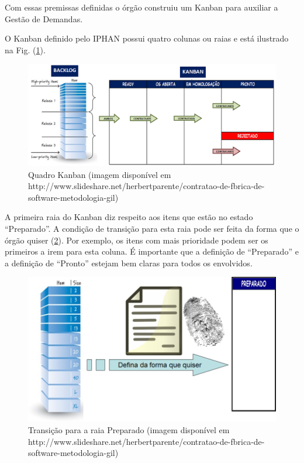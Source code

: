 Com essas premissas definidas o órgão construiu um Kanban para auxiliar a Gestão de Demandas. 

O Kanban definido pelo IPHAN possui quatro colunas ou raias e está ilustrado na Fig. (\ref{kanban1}).

\begin{figure}[H]
		\centering
		
			\includegraphics[scale=0.5]{figuras/kanbanIPHAN1.png}
		\caption{Quadro Kanban (imagem disponível em http://www.slideshare.net/herbertparente/contratao-de-fbrica-de-software-metodologia-gil) }
	\label{kanban1}
\end{figure}

A primeira raia do Kanban diz respeito aos itens que estão no estado “Preparado”. A condição de transição para esta raia pode ser feita da forma que o órgão quiser (\ref{kanban2}). Por exemplo, os itens com mais prioridade podem ser os primeiros a irem para esta coluna. É importante que a definição de “Preparado” e a definição de “Pronto” estejam bem claras para todos os envolvidos.

\begin{figure}[H]
		\centering
		
			\includegraphics[scale=0.5]{figuras/kanbanIPHAN2.png}
		\caption{Transição para a raia Preparado (imagem disponível em http://www.slideshare.net/herbertparente/contratao-de-fbrica-de-software-metodologia-gil)}
		\label{kanban2}
\end{figure}

